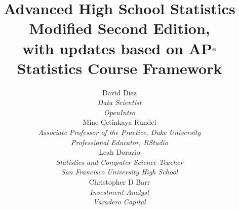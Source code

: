 
\title{\huge Advanced High School Statistics\vspace{1.5mm} \\ \Large Modified Second Edition,\\ with updates based on AP$^{\text{\textregistered}}$ Statistics Course Framework}
\author{David Diez \\
\small\emph{Data Scientist}\\
\small\emph{OpenIntro} \\[6mm]
Mine \c{C}etinkaya-Rundel \\
\small\emph{Associate Professor of the Practice,
    Duke University} \\
\small\emph{Professional Educator, RStudio} \\[6mm]
Leah Dorazio \\
\small\emph{Statistics and Computer Science Teacher}\\
\small\emph{San Francisco University High School} \\[6mm]
Christopher D Barr \\
\small\emph{Investment Analyst} \\
\small\emph{Varadero Capital} \\
}
